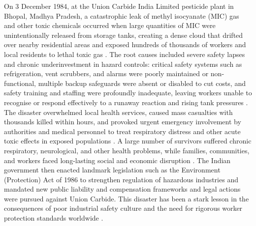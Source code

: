 On 3 December 1984, at the Union Carbide India Limited pesticide plant in Bhopal, Madhya Pradesh, a catastrophic leak of methyl isocyanate (MIC) gas and other toxic chemicals occurred when large quantities of MIC were unintentionally released from storage tanks, creating a dense cloud that drifted over nearby residential areas and exposed hundreds of thousands of workers and local residents to lethal toxic gas \cite{Broughton_2005, Britannica_Bhopal}. The root causes included severe safety lapses and chronic underinvestment in hazard controls: critical safety systems such as refrigeration, vent scrubbers, and alarms were poorly maintained or non-functional, multiple backup safeguards were absent or disabled to cut costs, and safety training and staffing were profoundly inadequate, leaving workers unable to recognise or respond effectively to a runaway reaction and rising tank pressures \cite{Broughton_2005}. The disaster overwhelmed local health services, caused mass casualties with thousands killed within hours, and provoked urgent emergency involvement by authorities and medical personnel to treat respiratory distress and other acute toxic effects in exposed populations \cite{Britannica_Bhopal}. A large number of survivors suffered chronic respiratory, neurological, and other health problems, while families, communities, and workers faced long-lasting social and economic disruption \cite{Broughton_2005}. The Indian government then enacted landmark legislation such as the Environment (Protection) Act of 1986 to strengthen regulation of hazardous industries and mandated new public liability and compensation frameworks and legal actions were pursued against Union Carbide. This disaster has been a stark lesson in the consequences of poor industrial safety culture and the need for rigorous worker protection standards worldwide \cite{Broughton_2005, Britannica_Bhopal}.

